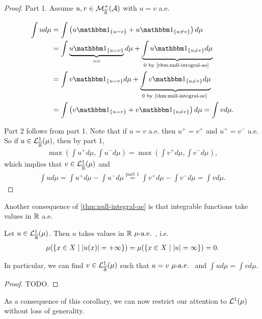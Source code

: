 \begin{proof}
	Part 1. Assume $u, v \in \mathcal{M}_{\overline{\mathbb{R}}}^+(\mathcal{A})$ with $u = v$ a.e.
	
	\begin{align*}
		\int u d\mu
		&= \int \left( u \ind_{\{u = v\}} + u \ind_{\{u \neq v\}} \right)d\mu \\
		&= \int \underbrace{u \ind_{\{u = v\}}}_{= v} d\mu + \underbrace{\int u \ind_{\{u \neq v\}} d\mu}_{0 \text{ by \autoref{thm:null-integral-ae} }} \\
		&= \int v \ind_{\{u = v\}} d\mu + \underbrace{\int v \ind_{\{u \neq v\}} d\mu}_{0 \text{ by \autoref{thm:null-integral-ae} }} \\
		&= \int \left( v \ind_{\{u = v\}} + v \ind_{\{u \neq v\}} \right)d\mu
		= \int v d\mu.
	\end{align*}
	
	Part 2 follows from part 1. Note that if $u = v$ a.e. then $u^+ = v^+$ and $u^+ = v^-$ a.e. So if $u \in \mathcal{L}_{\overline{\mathbb{R}}}^1(\mu)$, then by part 1,
	\begin{align*}
		\max\left(\int u^+d\mu, \int u^-d\mu\right) = \max \left( \int v^+ d\mu, \int v^- d\mu \right), 
	\end{align*}
	which implies that $v \in \mathcal{L}^1_{\overline{\mathbb{R}}}(\mu)$ and
	\begin{align*}
		\int u d\mu
		= \int u^+ d\mu - \int u^- d\mu
		\overset{\text{part 1}}{=} \int v^+d\mu - \int v^- d\mu
		= \int v d\mu.
	\end{align*}
\end{proof}

Another consequence of \autoref{thm:null-integral-ae} is that integrable functions take values in $\mathbb{R}$ a.e.

\begin{cor}
	Let $u \in \mathcal{L}^1_{\overline{\mathbb{R}}}(\mu)$. Then $u$ takes values in $\mathbb{R} \ \mu\text{-a.e. }$, i.e.
	\begin{align*}
		\mu(\{x \in X \mid \left\vert{u(x)}\right\vert = +\infty\}) = \mu(\{x \in X \mid \left\vert{u}\right\vert = \infty\}) = 0.
	\end{align*}
	
	In particular, we can find $v \in \mathcal{L}^1_{\overline{\mathbb{R}}}(\mu)$ such that $u = v \ \mu\text{-a.e. }$ and $\int u d\mu = \int v d\mu$.
\end{cor}

\begin{proof}
	TODO.
\end{proof}

As a consequence of this corollary, we can now restrict our attention to $\mathcal{L}^1(\mu)$ without loss of generality.

